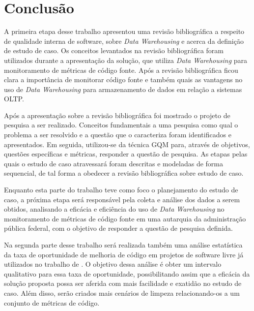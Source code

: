 \chapter{Conclusão}

A primeira etapa desse trabalho apresentou uma revisão bibliográfica a respeito de qualidade interna de software, sobre \textit{Data Warehousing} e acerca da definição de estudo de caso. Os conceitos levantados na revisão bibliográfica foram utilizados durante a apresentação da solução, que utiliza \textit{Data Warehousing} para monitoramento de métricas de código fonte. Após a revisão bibliográfica ficou clara a importância de monitorar código fonte e também quais as vantagens no uso de \textit{Data Warehousing} para armazenamento de dados em relação a sistemas OLTP. 

Após a apresentação sobre a revisão bibliográfica foi mostrado o projeto de pesquisa a ser realizado. Conceitos fundamentais a uma pesquisa como qual o problema a ser resolvido e a questão que o caracteriza foram identificados e apresentados. Em seguida, utilizou-se da  técnica GQM para, através de objetivos, questões específicas e métricas, responder a questão de pesquisa. As etapas pelas quais o estudo de caso atravessará foram descritas e modeladas de forma sequencial, de tal forma a obedecer a revisão bibliográfica sobre estudo de caso.

Enquanto esta parte do trabalho teve como foco o planejamento do estudo de caso, a próxima etapa será responsável pela coleta e análise dos dados a serem obtidos, analisando a eficácia e eficiência do uso de \textit{Data Warehousing} no monitoramento de métricas de código fonte em uma autarquia da administração pública federal, com o objetivo de responder a questão de pesquisa definida.

Na segunda parte desse trabalho será realizada também uma análise estatística da taxa de oportunidade de melhoria de código em projetos de software livre já utilizados no trabalho de \cite{Meirelles2013}. O objetivo dessa análise é obter um intervalo qualitativo para essa taxa de oportunidade, possibilitando assim que a eficácia da solução proposta possa ser aferida com mais facilidade e exatidão no estudo de caso. Além disso, serão criados mais cenários de limpeza relacionando-os a um conjunto de métricas de código.